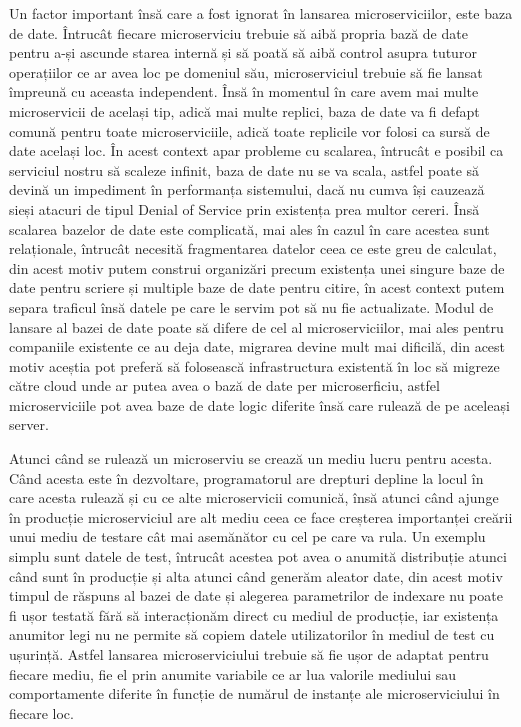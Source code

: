 Un factor important însă care a fost ignorat în lansarea microserviciilor, este baza de date.
Întrucât fiecare microserviciu trebuie să aibă propria bază de date pentru a-și ascunde starea
internă și să poată să aibă control asupra tuturor operațiilor ce ar avea loc pe 
domeniul său, microserviciul trebuie să fie lansat împreună cu aceasta independent. Însă 
în momentul în care avem mai multe microservicii de același tip, adică mai multe replici,
baza de date va fi defapt comună pentru toate microserviciile, adică toate replicile
vor folosi ca sursă de date același loc. În acest context apar probleme cu scalarea,
întrucât e posibil ca serviciul nostru să scaleze infinit, baza de date nu se va scala, 
astfel poate să devină un impediment în performanța sistemului, dacă nu cumva își cauzează
sieși atacuri de tipul Denial of Service prin existența prea multor cereri. Însă scalarea
bazelor de date este complicată, mai ales în cazul în care acestea sunt relaționale, întrucât
necesită fragmentarea datelor ceea ce este greu de calculat, din acest motiv putem 
construi organizări precum existența unei singure baze de date pentru scriere și multiple
baze de date pentru citire, în acest context putem separa traficul însă datele pe care le 
servim pot să nu fie actualizate. Modul de lansare al bazei de date poate să difere de cel
al microserviciilor, mai ales pentru companiile existente ce au deja date, migrarea devine
mult mai dificilă, din acest motiv aceștia pot preferă să folosească infrastructura existentă
în loc să migreze către cloud unde ar putea avea o bază de date per microserficiu, astfel microserviciile
pot avea baze de date logic diferite însă care rulează de pe aceleași server.

Atunci când se rulează un microserviu se crează un mediu lucru pentru acesta. Când acesta
este în dezvoltare, programatorul are drepturi depline la locul în care acesta rulează și
cu ce alte microservicii comunică, însă atunci când ajunge în producție microserviciul are
alt mediu ceea ce face creșterea importanței creării unui mediu de testare cât mai asemănător
cu cel pe care va rula. Un exemplu simplu sunt datele de test, întrucât acestea pot avea
o anumită distribuție atunci când sunt în producție și alta atunci când generăm aleator
date, din acest motiv timpul de răspuns al bazei de date și alegerea parametrilor de
indexare nu poate fi ușor testată fără să interacționăm direct cu mediul de producție,
iar existența anumitor legi nu ne permite să copiem datele utilizatorilor în mediul de test
cu ușurință. Astfel lansarea microserviciului trebuie să fie ușor de adaptat pentru fiecare mediu,
fie el prin anumite variabile ce ar lua valorile mediului sau comportamente diferite în funcție
de numărul de instanțe ale microserviciului în fiecare loc.


